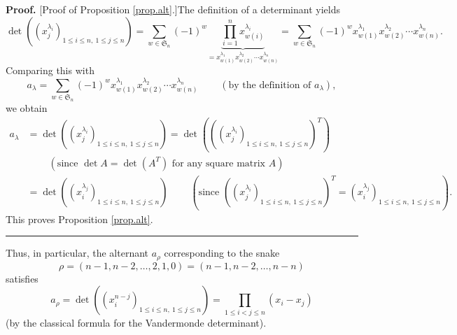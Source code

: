 \documentclass[numbers=enddot,12pt,final,onecolumn,notitlepage]{scrartcl}%
\theoremstyle{definition}
\newenvironment{proof}[1][Proof]{\noindent\textbf{#1.} }{\ \rule{0.5em}{0.5em}}
\let\sumnonlimits\sum
\let\prodnonlimits\prod
\renewcommand{\sum}{\sumnonlimits\limits}
\renewcommand{\prod}{\prodnonlimits\limits}
\newenvironment{verlong}{}{}
\newenvironment{vershort}{}{}
\begin{document}
\begin{verlong}


\begin{proof}
[Proof of Proposition \ref{prop.alt}.]The definition of a determinant yields
\[
\det\left(  \left(  x_{j}^{\lambda_{i}}\right)  _{1\leq i\leq n,\ 1\leq j\leq
n}\right)  =\sum_{w\in\mathfrak{S}_{n}}\left(  -1\right)  ^{w}%
\underbrace{\prod_{i=1}^{n}x_{w\left(  i\right)  }^{\lambda_{i}}%
}_{=x_{w\left(  1\right)  }^{\lambda_{1}}x_{w\left(  2\right)  }^{\lambda_{2}%
}\cdots x_{w\left(  n\right)  }^{\lambda_{n}}}=\sum_{w\in\mathfrak{S}_{n}%
}\left(  -1\right)  ^{w}x_{w\left(  1\right)  }^{\lambda_{1}}x_{w\left(
2\right)  }^{\lambda_{2}}\cdots x_{w\left(  n\right)  }^{\lambda_{n}}.
\]
Comparing this with%
\[
a_{\lambda}=\sum_{w\in\mathfrak{S}_{n}}\left(  -1\right)  ^{w}x_{w\left(
1\right)  }^{\lambda_{1}}x_{w\left(  2\right)  }^{\lambda_{2}}\cdots
x_{w\left(  n\right)  }^{\lambda_{n}}\ \ \ \ \ \ \ \ \ \ \left(  \text{by the
definition of }a_{\lambda}\right)  ,
\]
we obtain%
\begin{align*}
a_{\lambda}  &  =\det\left(  \left(  x_{j}^{\lambda_{i}}\right)  _{1\leq i\leq
n,\ 1\leq j\leq n}\right)  =\det\left(  \left(  \left(  x_{j}^{\lambda_{i}%
}\right)  _{1\leq i\leq n,\ 1\leq j\leq n}\right)  ^{T}\right) \\
&  \ \ \ \ \ \ \ \ \ \ \left(  \text{since }\det A=\det\left(  A^{T}\right)
\text{ for any square matrix }A\right) \\
&  =\det\left(  \left(  x_{i}^{\lambda_{j}}\right)  _{1\leq i\leq n,\ 1\leq
j\leq n}\right)  \ \ \ \ \ \ \ \ \ \ \left(  \text{since }\left(  \left(
x_{j}^{\lambda_{i}}\right)  _{1\leq i\leq n,\ 1\leq j\leq n}\right)
^{T}=\left(  x_{i}^{\lambda_{j}}\right)  _{1\leq i\leq n,\ 1\leq j\leq
n}\right)  .
\end{align*}
This proves Proposition \ref{prop.alt}.
\end{proof}
\end{verlong}

\begin{vershort}
Thus, in particular, the alternant $a_{\rho}$ corresponding to the snake
\[
\rho=\left(  n-1,n-2,\ldots,2,1,0\right)  =\left(  n-1,n-2,\ldots,n-n\right)
\]
satisfies%
\[
a_{\rho}=\det\left(  \left(  x_{i}^{n-j}\right)  _{1\leq i\leq n,\ 1\leq j\leq
n}\right)  =\prod_{1\leq i<j\leq n}\left(  x_{i}-x_{j}\right)
\]
(by the classical formula for the Vandermonde determinant).
\end{vershort}
\end{document}
